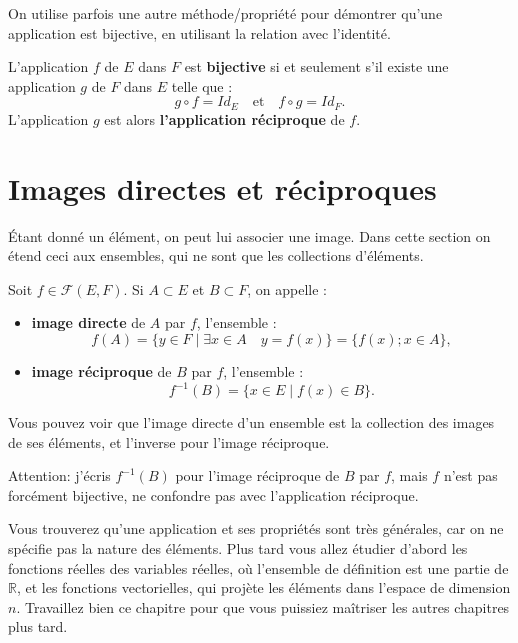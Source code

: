 \documentclass{article}
\begin{document}
On utilise parfois une autre méthode/propriété pour démontrer qu'une application est bijective, en utilisant la relation avec l'identité.

\begin{tcolorbox}[colback=blue!5!white,colframe=blue!75!black,title=Propriété 3.4]


L'application $f$ de $E$ dans $F$ est \textbf{bijective} si et seulement s’il existe une application $g$ de $F$ dans $E$ telle que :
\[
g \circ f = Id_E \quad \text{et} \quad f \circ g = Id_F.
\]
L’application $g$ est alors \textbf{l'application réciproque} de $f$.


\end{tcolorbox} 


\section{Images directes et réciproques}

Étant donné un élément, on peut lui associer une image. Dans cette section on étend ceci aux ensembles, qui ne sont que les collections d'éléments.

\begin{tcolorbox}[colback=red!5!white,colframe=red!75!black,title=Définition 3.8]

Soit $f \in \mathcal{F}(E,F)$. Si $A \subset E$ et $B \subset F$, on appelle :
\begin{itemize}
    \item \textbf{image directe} de $A$ par $f$, l’ensemble :
    \[
    f(A) = \{ y \in F \mid \exists x \in A \quad y = f(x) \} = \{ f(x) ; x \in A \},
    \]
    \item \textbf{image réciproque} de $B$ par $f$, l’ensemble :
    \[
    f^{-1}(B) = \{ x \in E \mid f(x) \in B \}.
    \]
\end{itemize}
\end{tcolorbox}

Vous pouvez voir que l'image directe d'un ensemble est la collection des images de ses éléments, et l'inverse pour l'image réciproque.

Attention: j'écris $f^{-1}(B)$ pour l'image réciproque de $B$ par $f$, mais $f$ n'est pas forcément bijective, ne confondre pas avec l'application réciproque. 

Vous trouverez qu'une application et ses propriétés sont très générales, car on ne spécifie pas la nature des éléments. Plus tard vous allez étudier d'abord les fonctions réelles des variables réelles, où l'ensemble de définition est une partie de $\mathbb{R}$, et les fonctions vectorielles, qui projète les éléments dans l'espace de dimension $n$. Travaillez bien ce chapitre pour que vous puissiez maîtriser les autres chapitres plus tard.
\end{document}
